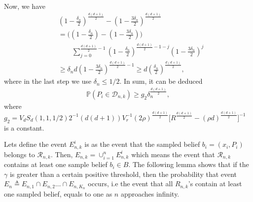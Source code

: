 \documentclass[Afour,sageh,times]{sagej}
\begin{document}
Now, we have
\begin{align*}
    &\left(1-\frac{\delta_n}{2}\right)^{\frac{d(d+1)}{2}}-\left(1-\frac{3 \delta_n}{2}\right)^{\frac{d(d+1)}{2}}\\
    & = \bigg(\left(1-\frac{ \delta_n}{2}\right) - \left(1-\frac{3 \delta_n}{2}\right)\bigg) \\
     &\qquad \sum_{j=0}^{\frac{d(d+1)}{2}-1} \left(1-\frac{\delta_n}{2}\right)^{\frac{d(d+1)}{2}-1-j}  \left(1-\frac{3 \delta_n}{2}\right)^{j}\\
        &\geq \delta_n d \left(1-\frac{3\delta_n}{2}\right)^{\frac{d(d+1)}{2}-1}\geq   d\left(\frac{\delta_n}{2}\right)^{\frac{d(d+1)}{2}},
\end{align*}
where in the last step we use $\delta_n\leq 1/2$. 
In sum, it can be deduced
\begin{align}
    \mathbb{P}(P_i\in\mathcal{D}_{n,k}) \geq g_2 \delta_n^{\frac{d(d+1)}{2}},
\end{align}
where $g_2=V_dS_d(1,1,1/2)2^{-1}(d(d+1))V_r^{-1}(2\rho)^{\frac{d(d+1)}{2}}\bigg[R^{\frac{d(d+1)}{2}}- (\rho d)^{\frac{d(d+1)}{2}} \bigg]^{-1}$ is a constant. 

Lets define the event $E^i_{n,k}$ is as the event that the sampled belief $b_i=(x_i,P_i)$ belongs to $\mathcal{R}_{n,k}$. Then, $E_{n,k}= \cup_{i=1}^n E^i_{n,k}$ which means the event that $\mathcal{R}_{n,k}$ contains at least one sample belief $b_i \in B$. The following lemma shows that if the $\gamma$ is greater than a certain positive threshold, then the probability that event $E_n\triangleq E_{n,1}\cap E_{n,2}\dots \cap E_{n,K_n}$  occurs, i.e the event that all $R_{n,k}$'s contain at least one sampled belief, equals to one as $n$ approaches infinity.
\end{document}
